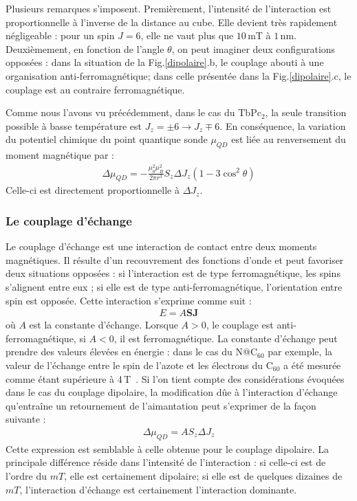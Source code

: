 Plusieurs remarques s'imposent. Premièrement, l'intensité de l'interaction est proportionnelle à l'inverse de la distance au cube. Elle devient très rapidement négligeable : pour un spin $J=6$, elle ne vaut plus que $10$\,mT à $1$\,nm. Deuxièmement, en fonction de l'angle $\theta$, on peut imaginer deux configurations opposées : dans la situation de la Fig.\ref{dipolaire}.b, le couplage abouti à une organisation anti-ferromagnétique; dans celle présentée dans la Fig.\ref{dipolaire}.c, le couplage est au contraire ferromagnétique.

Comme nous l'avons vu précédemment, dans le cas du TbPc$_{2}$, la seule transition possible à basse température est $J_z=\pm6 \rightarrow J_z \mp 6$. En conséquence, la variation du potentiel chimique du point quantique sonde $\mu_{QD}$ est liée au renversement du moment magnétique par :
\begin{eqnarray}
\Delta \mu_{QD} = -\frac{\mu_0^2 \mu_B^2}{2\pi r^3}S_z\Delta J_z(1 - 3 \cos^2 \theta)   \nonumber
\end{eqnarray}
Celle-ci est directement proportionnelle à $\Delta J_z$.


\subsubsection{Le couplage d'échange}
Le couplage d'échange est une interaction de contact entre deux moments magnétiques. Il résulte d'un recouvrement des fonctions d'onde et peut favoriser deux situations opposées : si l'interaction est de type ferromagnétique, les spins s'alignent entre eux ; si elle est de type anti-ferromagnétique, l'orientation entre spin est opposée. Cette interaction s'exprime comme suit :
\begin{eqnarray}
E = A\mathbf{SJ} \nonumber
\end{eqnarray}
où $A$ est la constante d'échange. Lorsque $A>0$, le couplage est anti-ferromagnétique, si $A<0$, il est ferromagnétique. La constante d'échange peut prendre des valeurs élevées en énergie : dans le cas du N@C$_{60}$ par exemple, la valeur de l'échange entre le spin de l'azote et les électrons du C$_{60}$ a été mesurée comme étant supérieure à 4\,T~\cite{Roch2011}. Si l'on tient compte des considérations évoquées dans le cas du couplage dipolaire, la modification d\^ue à l'interaction d'échange qu’entraîne un retournement de l'aimantation peut s'exprimer de la façon suivante :
\begin{eqnarray}
\Delta \mu_{QD} = AS_z\Delta J_z\nonumber
\end{eqnarray}
Cette expression est semblable à celle obtenue pour le couplage dipolaire. La principale différence réside dans l'intensité de l'interaction : si celle-ci est de l'ordre du $mT$, elle est certainement dipolaire; si elle est de quelques dizaines de $mT$, l'interaction d'échange est certainement l'interaction dominante.

